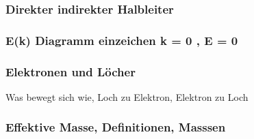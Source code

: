 \subsubsection{Direkter indirekter Halbleiter}
\subsubsection{E(k) Diagramm einzeichen k = 0 , E = 0}

\subsubsection{Elektronen und Löcher}
Was bewegt sich wie, Loch zu Elektron, Elektron zu Loch

\subsubsection{Effektive Masse, Definitionen, Masssen}
